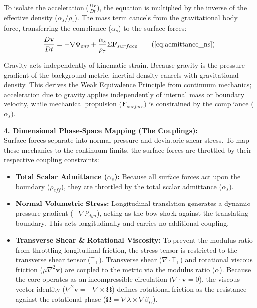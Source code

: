To isolate the acceleration ($\frac{D\mathbf{v}}{Dt}$), the equation is multiplied by the inverse of the effective density ($\alpha_s / \rho_\tau$). The mass term cancels from the gravitational body force, transferring the compliance ($\alpha_s$) to the surface forces: 
\begin{equation}
    \frac{D\mathbf{v}}{Dt} = -\nabla \Phi_{env} + \frac{\alpha_s}{\rho_\tau} \Sigma \mathbf{F}_{surface} \tag{\ref{eq:admittance_ns}}
\end{equation}

Gravity acts independently of kinematic strain. Because gravity is the pressure gradient of the background metric, inertial density cancels with gravitational density. This derives the Weak Equivalence Principle from continuum mechanics; acceleration due to gravity applies independently of internal mass or boundary velocity, while mechanical propulsion ($\mathbf{F}_{surface}$) is constrained by the compliance ($\alpha_s$). %

\textbf{4. Dimensional Phase-Space Mapping (The Couplings):} \\ 
Surface forces separate into normal pressure and deviatoric shear stress. To map these mechanics to the continuum limits, the surface forces are throttled by their respective coupling constraints: 

\begin{itemize}[leftmargin=*]
    \item \textbf{Total Scalar Admittance ($\alpha_s$):} Because all surface forces act upon the boundary ($\rho_{eff}$), they are throttled by the total scalar admittance ($\alpha_s$). 
    \item \textbf{Normal Volumetric Stress:} Longitudinal translation generates a dynamic pressure gradient ($-\nabla P_{dyn}$), acting as the bow-shock against the translating boundary. This acts longitudinally and carries no additional coupling. 
    \item \textbf{Transverse Shear \& Rotational Viscosity:} To prevent the modulus ratio from throttling longitudinal friction, the stress tensor is restricted to the transverse shear tensor ($\mathbb{T}_{\perp}$). Transverse shear ($\nabla \cdot \mathbb{T}_{\perp}$) and rotational viscous friction ($\mu \nabla^2 \mathbf{v}$) are coupled to the metric via the modulus ratio ($\alpha$). Because the core operates as an incompressible circulation ($\nabla \cdot \mathbf{v} = 0$), the viscous vector identity ($\nabla^2 \mathbf{v} = -\nabla \times \boldsymbol{\Omega}$) defines rotational friction as the resistance against the rotational phase ($\boldsymbol{\Omega} = \nabla\lambda \times \nabla\beta_\Omega$). 
\end{itemize}

